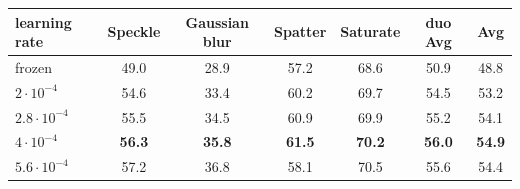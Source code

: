 \begin{tabular}{@{}l cccc cc@{}}
\toprule
\vit{} learning rate & Speckle & Gaussian blur & Spatter & Saturate & duo Avg & \vit{} Avg \\
\midrule
frozen & 49.0 & 28.9 & 57.2 & 68.6 & 50.9 & 48.8 \\
\midrule
$2{\cdot}10^{-4}$ & 54.6 & 33.4 & 60.2 & 69.7 & 54.5 & 53.2 \\
$2.8{\cdot}10^{-4}$ & 55.5 & 34.5 & 60.9 & 69.9 & 55.2 & 54.1 \\
\textbf{$4{\cdot}10^{-4}$} & \textbf{56.3} & \textbf{35.8} & \textbf{61.5} & \textbf{70.2} & \textbf{56.0} & \textbf{54.9} \\
$5.6{\cdot}10^{-4}$ & 57.2 & 36.8 & 58.1 & 70.5 & 55.6 & 54.4 \\
\bottomrule
\end{tabular}
